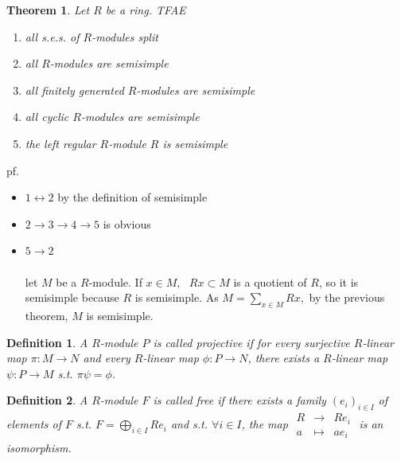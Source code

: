 \documentclass[12pt,letterpaper]{report}
\newtheorem{definition}{Definition}[section]
\newtheorem{theorem}{Theorem}[section]
\begin{document}
\begin{theorem}Let $R$ be a ring. TFAE\begin{enumerate}\item all s.e.s. of $R$-modules split\item all $R$-modules are semisimple\item all finitely generated $R$-modules are semisimple\item all cyclic $R$-modules are semisimple\item the left regular $R$-module $R$ is semisimple\end{enumerate}\end{theorem}
pf.
\begin{itemize}\item $1\leftrightarrow 2$ by the definition of semisimple
\item $2\rightarrow 3\rightarrow 4\rightarrow 5$ is obvious
\item $5\rightarrow 2$
\\\\let $M$ be a $R$-module. If $x\in M, \,\,\,\,Rx\subset M$ is a quotient of $R$, so it is semisimple because $R$ is semisimple. As $M=\sum_{x\in M}Rx,$ by the previous theorem, $M$ is semisimple.

\end{itemize} 
\begin{definition}A $R$-module $P$ is called projective if for every surjective $R$-linear map $\pi:M\rightarrow N$ and every $R$-linear map $\phi:P\rightarrow N$, there exists a $R$-linear map $\psi:P\rightarrow M$ s.t. $\pi\psi=\phi$.\end{definition}
\begin{definition}A $R$-module $F$ is called free if there exists a family $(e_{i})_{i\in I}$ of elements of $F$ s.t. $F=\bigoplus_{i\in I}Re_{i}$ and s.t. $\forall i\in I$, the map $\begin{array}{rrr}R&\rightarrow &Re_{i}\\a&\mapsto&ae_{i}\end{array}$ is an isomorphism.\end{definition}
\end{document}
